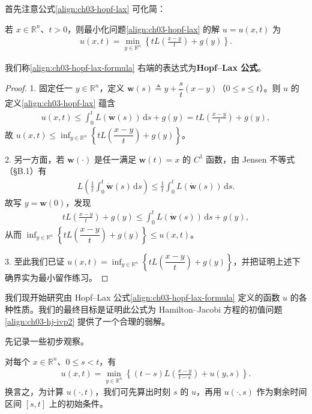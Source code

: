\documentclass[../../main.tex]{subfiles}
\begin{document}
首先注意公式\eqref{align:ch03-hopf-lax} 可化简：

\begin{theorem}\label{theorem:ch03-hopf-lax}若 $x\in\mathbb{R}^n$、$t>0$，则最小化问题\eqref{align:ch03-hopf-lax} 的解 $u=u(x,t)$ 为
\begin{align}\label{align:ch03-hopf-lax-formula}
u(x,t)=\min_{y\in\mathbb{R}^n}\left\{tL\!\left(\frac{x-y}{t}\right)+g(y)\right\}.
\end{align}
\end{theorem}

我们称\eqref{align:ch03-hopf-lax-formula} 右端的表达式为\textbf{Hopf--Lax 公式}。

\begin{proof}
1. 固定任一 $y\in\mathbb{R}^n$，定义 $\mathbf{w}(s)\triangleq y+\dfrac{s}{t}(x-y)$（$0\leqslant s\leqslant t$）。则 $u$ 的定义\eqref{align:ch03-hopf-lax} 蕴含
\begin{align*}
u(x,t)\leqslant\int_0^t L(\dot{\mathbf{w}}(s))\,\mathrm{d}s+g(y)=tL\!\left(\frac{x-y}{t}\right)+g(y),
\end{align*}
故 $u(x,t)\leqslant\inf_{y\in\mathbb{R}^n}\left\{tL\!\left(\dfrac{x-y}{t}\right)+g(y)\right\}$。

2. 另一方面，若 $\mathbf{w}(\cdot)$ 是任一满足 $\mathbf{w}(t)=x$ 的 $C^1$ 函数，由 Jensen 不等式（\S B.1）有
\begin{align*}
L\!\left(\frac{1}{t}\int_0^t\dot{\mathbf{w}}(s)\,\mathrm{d}s\right)\leqslant\frac{1}{t}\int_0^t L(\dot{\mathbf{w}}(s))\,\mathrm{d}s.
\end{align*}
故写 $y=\mathbf{w}(0)$，发现
\begin{align*}
tL\!\left(\frac{x-y}{t}\right)+g(y)\leqslant\int_0^t L(\dot{\mathbf{w}}(s))\,\mathrm{d}s+g(y),
\end{align*}
从而 $\inf_{y\in\mathbb{R}^n}\left\{tL\!\left(\dfrac{x-y}{t}\right)+g(y)\right\}\leqslant u(x,t)$。

3. 至此我们已证 $u(x,t)=\inf_{y\in\mathbb{R}^n}\left\{tL\!\left(\dfrac{x-y}{t}\right)+g(y)\right\}$，并把证明上述下确界实为最小留作练习。
\end{proof}

我们现开始研究由 Hopf--Lax 公式\eqref{align:ch03-hopf-lax-formula} 定义的函数 $u$ 的各种性质。我们的最终目标是证明此公式为 Hamilton--Jacobi 方程的初值问题\eqref{align:ch03-hj-ivp2} 提供了一个合理的弱解。

先记录一些初步观察。

\begin{lemma}[一个泛函恒等式]\label{lemma:ch03-semigroup}对每个 $x\in\mathbb{R}^n$、$0\leqslant s<t$，有
\begin{align}\label{align:ch03-semigroup}
u(x,t)=\min_{y\in\mathbb{R}^n}\left\{(t-s)L\!\left(\frac{x-y}{t-s}\right)+u(y,s)\right\}.
\end{align}
换言之，为计算 $u(\cdot,t)$，我们可先算出时刻 $s$ 的 $u$，再用 $u(\cdot,s)$ 作为剩余时间区间 $[s,t]$ 上的初始条件。
\end{lemma}
\end{document}
